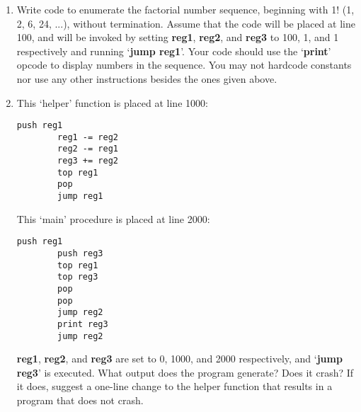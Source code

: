 \documentclass[11pt]{article}
\begin{document}
\begin{enumerate}
  \begin{enumerate}
      \item Write code to enumerate the factorial number sequence, beginning with 1! (1, 2, 6, 24, ...), without termination. Assume that the code will be placed at line 100, and will be invoked by setting \textbf{reg1}, \textbf{reg2}, and \textbf{reg3} to 100, 1, and 1 respectively and running ‘\textbf{jump reg1}’. Your code should use the ‘\textbf{print}’ opcode to display numbers in the sequence. You may not hardcode constants nor use any other instructions besides the ones given above.\\
        \newpage
      \item This ‘helper’ function is placed at line 1000:
      \begin{lstlisting}[firstnumber=1000]
        push reg1
        reg1 -= reg2
        reg2 -= reg1
        reg3 += reg2
        top reg1
        pop
        jump reg1
      \end{lstlisting}
      This ‘main’ procedure is placed at line 2000:
      \begin{lstlisting}[firstnumber=2000]
        push reg1
        push reg3
        top reg1
        top reg3
        pop
        pop
        jump reg2
        print reg3
        jump reg2
      \end{lstlisting}
      \textbf{reg1}, \textbf{reg2}, and \textbf{reg3} are set to 0, 1000, and 2000 respectively, and ‘\textbf{jump reg3}’ is executed. What output does the program generate? Does it crash? If it does, suggest a one-line change to the helper function that results in a program that does not crash.
  \end{enumerate}

  
  
\end{enumerate}   
\end{document}
